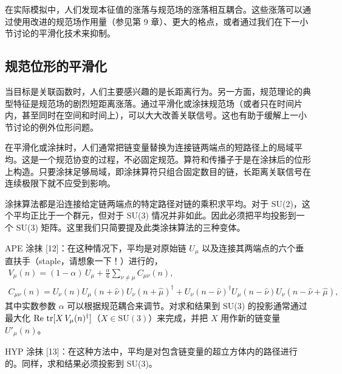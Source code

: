 在实际模拟中，人们发现本征值的涨落与规范场的涨落相互耦合。这些涨落可以通过使用改进的规范场作用量（参见第 9 章）、更大的格点，或者通过我们在下一小节讨论的平滑化技术来抑制。

\subsection{规范位形的平滑化}

当目标是关联函数时，人们主要感兴趣的是长距离行为。另一方面，规范理论的典型特征是规范场的剧烈短距离涨落。通过平滑化或涂抹规范场（或者只在时间片内，甚至同时在空间和时间上），可以大大改善关联信号。这也有助于缓解上一小节讨论的例外位形问题。

在平滑化或涂抹时，人们通常把链变量替换为连接链两端点的短路径上的局域平均。这是一个规范协变的过程，不必固定规范。算符和传播子于是在涂抹后的位形上构造。只要涂抹足够局域，即涂抹算符只组合固定数目的链，长距离关联信号在连续极限下就不应受到影响。

涂抹算法都是沿连接给定链两端点的特定路径对链的乘积求平均。对于 SU(2)，这个平均正比于一个群元，但对于 SU(3) 情况并非如此。因此必须把平均投影到一个 SU(3) 矩阵。这里我们只简要提及此类涂抹算法的三种变体。

APE 涂抹 [12]：在这种情况下，平均是对原始链 $U_\mu$ 以及连接其两端点的六个垂直扶手（staple，请想象一下！）进行的，
\begin{equation}
  \begin{gathered}
    V_\mu(n) = (1 - \alpha)\, U_\mu + \frac{\alpha}{6}\sum_{\nu\neq\mu}
      C_{\mu\nu}(n) , \\
    C_{\mu\nu}(n) = U_\nu(n) U_\mu(n+\hat\nu) U_\nu(n+\hat\mu)^\dagger
      + U_\nu(n-\hat\nu)^\dagger U_\mu(n-\hat\nu)
      U_\nu(n-\hat\nu+\hat\mu) ,
  \end{gathered}
\end{equation}
其中实数参数 $\alpha$ 可以根据规范耦合来调节。对求和结果到 SU(3) 的投影通常通过最大化 $\operatorname{Re}\,\operatorname{tr}[X\, V_\mu(n)^\dagger]$（$X \in \mathrm{SU}(3)$）来完成，并把 $X$ 用作新的链变量 $U'_\mu(n)$。

HYP 涂抹 [13]：在这种方法中，平均是对包含链变量的超立方体内的路径进行的。同样，求和结果必须投影到 SU(3)。

